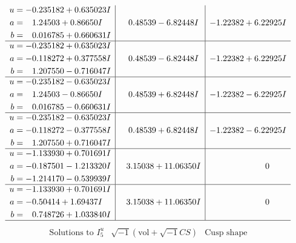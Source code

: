 \documentclass[1p]{elsarticle_modified}
\theoremstyle{definition}
\newcommand{\I}{\sqrt{-1}}
\begin{document}
$$\begin{array}{c|c|c}
\begin{aligned}
u &= -0.235182 + 0.635023 I \\
a &= \phantom{-}1.24503 + 0.86650 I \\
b &= \phantom{-}0.016785 + 0.660631 I\end{aligned}
 & \phantom{-}0.48539 - 6.82448 I & -1.22382 + 6.22925 I \\ \hline\begin{aligned}
u &= -0.235182 + 0.635023 I \\
a &= -0.118272 + 0.377558 I \\
b &= \phantom{-}1.207550 - 0.716047 I\end{aligned}
 & \phantom{-}0.48539 - 6.82448 I & -1.22382 + 6.22925 I \\ \hline\begin{aligned}
u &= -0.235182 - 0.635023 I \\
a &= \phantom{-}1.24503 - 0.86650 I \\
b &= \phantom{-}0.016785 - 0.660631 I\end{aligned}
 & \phantom{-}0.48539 + 6.82448 I & -1.22382 - 6.22925 I \\ \hline\begin{aligned}
u &= -0.235182 - 0.635023 I \\
a &= -0.118272 - 0.377558 I \\
b &= \phantom{-}1.207550 + 0.716047 I\end{aligned}
 & \phantom{-}0.48539 + 6.82448 I & -1.22382 - 6.22925 I \\ \hline\begin{aligned}
u &= -1.133930 + 0.701691 I \\
a &= -0.187501 - 1.213320 I \\
b &= -1.214170 - 0.539939 I\end{aligned}
 & \phantom{-}3.15038 + 11.06350 I & \phantom{-0.000000 } 0 \\ \hline\begin{aligned}
u &= -1.133930 + 0.701691 I \\
a &= -0.50414 + 1.69437 I \\
b &= \phantom{-}0.748726 + 1.033840 I\end{aligned}
 & \phantom{-}3.15038 + 11.06350 I & \phantom{-0.000000 } 0\\
 \hline 
 \end{array}$$\newpage$$\begin{array}{c|c|c}  
\text{Solutions to }I^u_{5}& \I (\text{vol} + \sqrt{-1}CS) & \text{Cusp shape}\\
 \hline 
\begin{aligned}

\end{aligned}
\end{array}$$
\end{document}
